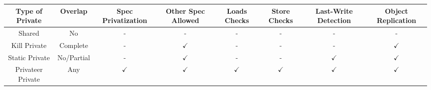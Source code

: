 \centering
\tiny
\begin{tabular}{|c|c|c|c|c|c|c|c|}
  \hline
  Type of Private &
  Overlap         &
  Spec Privatization &
  Other Spec Allowed    &
  Loads Checks  &
  Store Checks    &
  Last-Write Detection &
  Object Replication \\

 \hline
 Shared & No & - & - & - & - & - & - \\
 \hline
 Kill Private & Complete & - & $\checkmark$ & - & - & - & $\checkmark$ \\
 \hline
 Static Private & No/Partial & - & $\checkmark$ & - & - &
 $\checkmark$ & $\checkmark$ \\
 \hline
 Privateer Private & Any & $\checkmark$ & $\checkmark$ & $\checkmark$ & $\checkmark$ &
 $\checkmark$ & $\checkmark$ \\
 \hline
\end{tabular}

